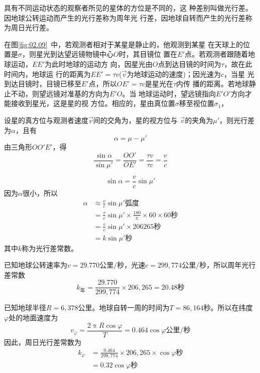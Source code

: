 具有不同运动状态的观察者所见的星体的方位是不同的，这
种差别叫做光行差。因地球公转运动而产生的光行差称为周年光
行差，因地球自转而产生的光行差称为周日光行差。

在图\ref{fig:02.09}~中，若观测者相对于某星是静止的，他观测到某星
在天球上的位置是$\sigma$，则星光到达望远镜物镜中心$O$时，其目镜位
置在$E'$点。若观测者跟随着地球运动，$EE'$为此时地球的运动方
向，因星光由$O$点到达目镜的时间为$\tau$，故在此时间内，地球运
行的距离为$EE'=\tau v$($\vec{v}$为地球运动的速度)；因光速为$c$，当星
光到达目镜时，目镜已移至$E'$点，所以$OE'=\tau c$是星光在$\tau$内传
播的距离。若地球静止不动，则望远镜对准基的方向为$E'O$。当
地球运动时，望远镜指向$E'O'$方向才能接收到星光，这是星的视
方位。相应的，星由真位置$\sigma$移至视位置$\sigma_1$，

设星的真方位与观测者速度$\vec{v}$间的交角为，星的视方位与
$\vec{v}$的夹角为$\mu'$，则光行差为$\alpha$，且有
\begin{equation*}
    \alpha=\mu-\mu'
\end{equation*}
由三角形$OO'E'$，得
\begin{equation*}
    \frac{\sin\alpha}{\sin\mu'}=\frac{OO'}{OE'}=\frac{\tau v}{\tau c}=\frac{v}{c}
\end{equation*}

\begin{equation*}
    \sin\alpha=\frac{v}{c}\sin\mu'
\end{equation*}
因为$\alpha$很小，所以
\begin{align*}
    \alpha&\approx\frac{v}{c}\sin\mu'\text{弧度} \\
        &=\frac{v}{c}\sin\mu'\times\frac{180}{\uppi}\times 60 \times 60 \text{秒} \\
        &=\frac{v}{c}\sin\mu'\times 206265\text{秒} \\
        &=k\sin\mu'\text{秒}
\end{align*}
其中$k$称为光行差常数。

已知地球公转速率为$v=29.770\text{公里/秒}$，光速$c=299,774
\text{公里/秒}$，所以周年光行差常数
\begin{equation*}
    k_\text{年}=\frac{29.770}{299,774}\times 206,265=20.48\text{秒}
\end{equation*}

已知地球半径$R=6,378\text{公里}$。地球自转一周的时间为$T=
86,164\text{秒}$。所以在纬度$\varphi$处的地面速度为
\begin{equation*}
    v_\varphi=\frac{2\uppi R\cos\varphi}{T}=0.464\cos\varphi\text{公里/秒}
\end{equation*}
因此，周日光行差常数为
\begin{align*}
    k_\varphi&=\frac{0.464}{299,774}\times 206,265\times\cos\varphi\text{秒} \\
        &=0.32\cos\varphi\text{秒}
\end{align*}